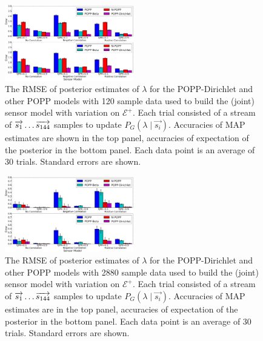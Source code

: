 \begin{figure}[t!]
	\centering
	\includegraphics[width=0.5\textwidth]{./figures/tjpr_comparison_120.png}
    \caption{The RMSE of posterior estimates of $\lambda$ for the POPP-Dirichlet and other POPP models with 120 sample data used to build the (joint) sensor model with variation on $\mathcal{E^+}$. Each trial consisted of a stream of $\protect\overrightarrow{s_1} \ldots \protect\overrightarrow{s_{144}}$ samples to update $P_G(\lambda \mid \overrightarrow{s_i})$. Accuracies of MAP estimates are shown in the top panel, accuracies of expectation of the posterior in the bottom panel. Each data point is an average of 30 trials. Standard errors are shown.} 
	\label{fig:tjpr_comparison_120}
\end{figure}

\begin{figure}[t!]
	\centering
	\includegraphics[width=0.5\textwidth]{./figures/tjpr_comparison_2880.png}
    \caption{The RMSE of posterior estimates of $\lambda$ for the POPP-Dirichlet and other POPP models with 2880 sample data used to build the (joint) sensor model with variation on $\mathcal{E^+}$. Each trial consisted of a stream of $\protect\overrightarrow{s_1} \ldots \protect\overrightarrow{s_{144}}$ samples to update $P_G(\lambda \mid \overrightarrow{s_i})$. Accuracies of MAP estimates are in the top panel, accuracies of expectation of the posterior in the bottom panel. Each data point is an average of 30 trials. Standard errors are shown.} 
	\label{fig:tjpr_comparison_2880}
\end{figure}

